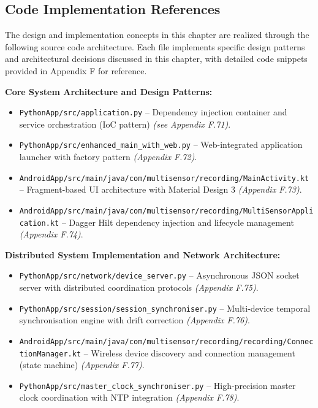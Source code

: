 \documentclass[11pt,a4paper]{report}
\begin{document}
\subsection*{Code Implementation References}

The design and implementation concepts in this chapter are realized through the following source code architecture. Each file implements specific design patterns and architectural decisions discussed in this chapter, with detailed code snippets provided in Appendix F for reference.

\textbf{Core System Architecture and Design Patterns:}
\begin{itemize}
  \item \texttt{PythonApp/src/application.py} – Dependency injection container and service orchestration (IoC pattern) \textit{(see Appendix F.71)}.
  \item \texttt{PythonApp/src/enhanced\_main\_with\_web.py} – Web-integrated application launcher with factory pattern \textit{(Appendix F.72)}.
  \item \texttt{AndroidApp/src/main/java/com/multisensor/recording/MainActivity.kt} – Fragment-based UI architecture with Material Design 3 \textit{(Appendix F.73)}.
  \item \texttt{AndroidApp/src/main/java/com/multisensor/recording/MultiSensorApplication.kt} – Dagger Hilt dependency injection and lifecycle management \textit{(Appendix F.74)}.
\end{itemize}

\textbf{Distributed System Implementation and Network Architecture:}
\begin{itemize}
  \item \texttt{PythonApp/src/network/device\_server.py} – Asynchronous JSON socket server with distributed coordination protocols \textit{(Appendix F.75)}.
  \item \texttt{PythonApp/src/session/session\_synchroniser.py} – Multi-device temporal synchronisation engine with drift correction \textit{(Appendix F.76)}.
  \item \texttt{AndroidApp/src/main/java/com/multisensor/recording/recording/ConnectionManager.kt} – Wireless device discovery and connection management (state machine) \textit{(Appendix F.77)}.
  \item \texttt{PythonApp/src/master\_clock\_synchroniser.py} – High-precision master clock coordination with NTP integration \textit{(Appendix F.78)}.
\end{itemize}
\end{document}
